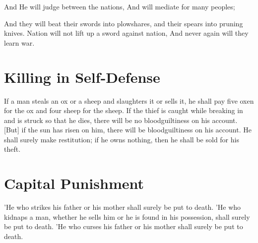 \vspace{4\baselineskip}
\begin{scripture}[Isaiah 2:4]
    And He will judge between the nations,
    And will mediate for many peoples;

    And they will beat their swords into plowshares, and their spears into pruning knives.
    Nation will not lift up a sword against nation,
    And never again will they learn war.
\end{scripture}

\vspace{4\baselineskip}

\vspace{10\baselineskip}


\section{Killing in Self-Defense}
\begin{scripture}[Exodus 22:1-3]
    If a man steals an ox or a sheep and slaughters it or sells it, he shall pay five oxen for the ox and four sheep for the sheep.
    If the thief is caught while breaking in and is struck so that he dies, there will be no bloodguiltiness on his account.
    [But] if the sun has risen on him, there will be bloodguiltiness on his account. He shall surely make restitution; if he owns nothing, then he shall be sold for his theft.
\end{scripture}

\newpage
\section{Capital Punishment}
\begin{scripture}[Exodus 21:15-17]
    'He who strikes his father or his mother shall surely be put to death.
    'He who kidnaps a man, whether he sells him or he is found in his possession, shall surely be put to death.
    'He who curses his father or his mother shall surely be put to death.
\end{scripture}

